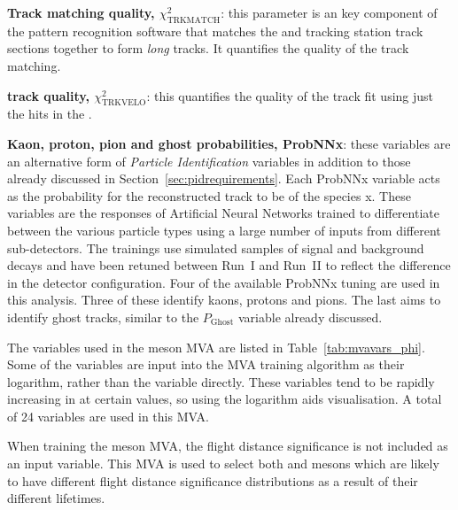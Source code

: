 \begin{description}
\item \textbf{Track matching quality, $\chi^{2}_{\text{TRKMATCH}}$}: this parameter is an key component of the pattern recognition software that matches the \velo and tracking station track sections together to form \emph{long} tracks. It quantifies the quality of the track matching.

\item \textbf{\velo track quality, $\chi^{2}_{\text{TRKVELO}}$}: this quantifies the quality of the track fit using just the hits in the \velo.  


\item \textbf{Kaon, proton, pion and ghost probabilities, ProbNNx}: these variables are an alternative form of \emph{Particle Identification} variables in addition to those already discussed in Section~\ref{sec:pidrequirements}. Each ProbNNx variable acts as the probability for the reconstructed track to be of the species x. These variables are the responses of Artificial Neural Networks trained to differentiate between the various particle types using a large number of inputs from different sub-detectors. The trainings use simulated samples of signal and background decays and have been retuned between Run~I and Run~II to reflect the difference in the detector configuration. Four of the available ProbNNx tuning are used in this analysis. Three of these identify kaons, protons and pions. The last aims to identify ghost tracks, similar to the $P_{\text{Ghost}}$ variable already discussed. 
\end{description}

The variables used in the \phiz meson MVA are listed in Table~\ref{tab:mvavars_phi}. Some of the variables are input into the MVA training algorithm as their logarithm, rather than the variable directly. These variables tend to be rapidly increasing in at certain values, so using the logarithm aids visualisation. A total of 24 variables are used in this MVA.

When training the \phiz meson MVA, the flight distance significance is not included as an input variable. This MVA is used to select both \phiz and \Dzb mesons which are likely to have different flight distance significance distributions as a result of their different lifetimes. 


